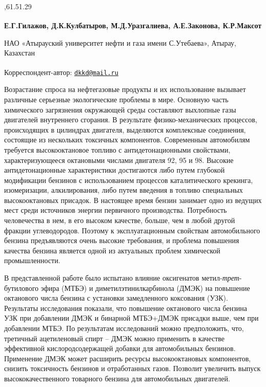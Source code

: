 ,61.51.29

\begin{articleheader}

{\bfseries Е.Г.Гилажов, Д.К.Кулбатыров\textsuperscript{\envelope }, М.Д.Уразгалиева,
А.Е.Законова, К.Р.Максот}
\end{articleheader}

\begin{affiliation}
НАО «Атырауский университет нефти и газа имени С.Утебаева», Атырау,
Казахстан

\raggedright {\bfseries \textsuperscript{\envelope }}Корреспондент-автор: \href{mailto:dkkd@mail.ru}{\nolinkurl{dkkd@mail.ru}}
\end{affiliation}

Возрастание спроса на нефтегазовые продукты и их использование вызывает
различные серьезные экологические проблемы в мире. Основную часть
химического загрязнения окружающей среды составляют выхлопные газы
двигателей внутреннего сгорания. В результате физико-механических
процессов, происходящих в цилиндрах двигателя, выделяются комплексные
соединения, состоящие из нескольких токсичных компонентов. Современным
автомобилям требуется высокооктановое топливо с антидетонационными
свойствами, характеризующееся октановыми числами двигателя 92, 95 и 98.
Высокие антидетонационные характеристики достигаются либо путем глубокой
модификации бензинов с использованием процессов каталитического
крекинга, изомеризации, алкилирования, либо путем введения в топливо
специальных высокооктановых присадок. В настоящее время бензин занимает
одно из ведущих мест среди источников энергии первичного производства.
Потребность человечества в нем, в его высоком качестве, больше, чем в
любой другой фракции углеводородов. Поэтому к эксплуатационным свойствам
автомобильного бензина предъявляются очень высокие требования, и
проблема повышения качества бензина является одной из актуальных проблем
химической промышленности.

В представленной работе было испытано влияние оксигенатов
метил-\emph{трет}-бутилового эфира (МТБЭ) и диметилэтинилкарбинола
(ДМЭК) на повышение октанового числа бензина с установки замедленного
коксования (УЗК). Результаты исследования показали, что повышение
октанового числа бензина УЗК при добавлении ДМЭК и бинарной МТБЭ+ДМЭК
присадки выше, чем при добавлении МТБЭ. По результатам исследований
можно предположить, что, третичный ацетиленовый спирт -- ДМЭК можно
применить в качестве эффективной кислородсодержащей добавки для
автомобильных бензинов. Применение ДМЭК может расширить ресурсы
высокооктановых компонентов, снизить токсичность бензинов и отработанных
газов. Позволит увеличить выпуск высококачественного товарного бензина
для автомобильных двигателей.

